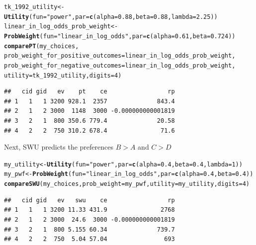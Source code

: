 \documentclass{article}\usepackage[]{graphicx}\usepackage[]{color}
\makeatletter
\newcommand{\hlnum}[1]{\textcolor[rgb]{0.686,0.059,0.569}{#1}}%
\newcommand{\hlstr}[1]{\textcolor[rgb]{0.192,0.494,0.8}{#1}}%
\newcommand{\hlstd}[1]{\textcolor[rgb]{0.345,0.345,0.345}{#1}}%
\newcommand{\hlkwb}[1]{\textcolor[rgb]{0.69,0.353,0.396}{#1}}%
\newcommand{\hlkwc}[1]{\textcolor[rgb]{0.333,0.667,0.333}{#1}}%
\newcommand{\hlkwd}[1]{\textcolor[rgb]{0.737,0.353,0.396}{\textbf{#1}}}%
\newenvironment{kframe}{%
 \def\at@end@of@kframe{}%
 \ifinner\ifhmode%
  \def\at@end@of@kframe{\end{minipage}}%
  \begin{minipage}{\columnwidth}%
 \fi\fi%
 \def\FrameCommand##1{\hskip\@totalleftmargin \hskip-\fboxsep
 \colorbox{shadecolor}{##1}\hskip-\fboxsep
     \hskip-\linewidth \hskip-\@totalleftmargin \hskip\columnwidth}%
 \MakeFramed {\advance\hsize-\width
   \@totalleftmargin\z@ \linewidth\hsize
   \@setminipage}}%
 {\par\unskip\endMakeFramed%
 \at@end@of@kframe}
\newenvironment{knitrout}{}{} %
\makeatother
\begin{document}
\begin{knitrout}
\color{fgcolor}\begin{kframe}
\begin{alltt}
\hlstd{tk_1992_utility} \hlkwb{<-} \hlkwd{Utility}\hlstd{(}\hlkwc{fun}\hlstd{=}\hlstr{"power"}\hlstd{,} \hlkwc{par}\hlstd{=}\hlkwd{c}\hlstd{(}\hlkwc{alpha}\hlstd{=}\hlnum{0.88}\hlstd{,} \hlkwc{beta}\hlstd{=}\hlnum{0.88}\hlstd{,} \hlkwc{lambda}\hlstd{=}\hlnum{2.25}\hlstd{))}
\hlstd{linear_in_log_odds_prob_weight} \hlkwb{<-} \hlkwd{ProbWeight}\hlstd{(}\hlkwc{fun}\hlstd{=}\hlstr{"linear_in_log_odds"}\hlstd{,} \hlkwc{par}\hlstd{=}\hlkwd{c}\hlstd{(}\hlkwc{alpha}\hlstd{=}\hlnum{0.61}\hlstd{,} \hlkwc{beta}\hlstd{=}\hlnum{0.724}\hlstd{))}
\hlkwd{comparePT}\hlstd{(my_choices,}
        \hlkwc{prob_weight_for_positive_outcomes}\hlstd{=linear_in_log_odds_prob_weight,}
        \hlkwc{prob_weight_for_negative_outcomes}\hlstd{=linear_in_log_odds_prob_weight,}
        \hlkwc{utility}\hlstd{=tk_1992_utility,} \hlkwc{digits}\hlstd{=}\hlnum{4}\hlstd{)}
\end{alltt}
\begin{verbatim}
##   cid gid   ev    pt    ce                 rp
## 1   1   1 3200 928.1  2357              843.4
## 2   1   2 3000  1148  3000 -0.000000000001819
## 3   2   1  800 350.6 779.4              20.58
## 4   2   2  750 310.2 678.4               71.6
\end{verbatim}
\end{kframe}
\end{knitrout}


Next, SWU predicts the preferences $B > A$ and $C > D$

\begin{knitrout}
\color{fgcolor}\begin{kframe}
\begin{alltt}
\hlstd{my_utility} \hlkwb{<-} \hlkwd{Utility}\hlstd{(}\hlkwc{fun}\hlstd{=}\hlstr{"power"}\hlstd{,} \hlkwc{par}\hlstd{=}\hlkwd{c}\hlstd{(}\hlkwc{alpha}\hlstd{=}\hlnum{0.4}\hlstd{,} \hlkwc{beta}\hlstd{=}\hlnum{0.4}\hlstd{,} \hlkwc{lambda}\hlstd{=}\hlnum{1}\hlstd{))}
\hlstd{my_pwf} \hlkwb{<-} \hlkwd{ProbWeight}\hlstd{(}\hlkwc{fun}\hlstd{=}\hlstr{"linear_in_log_odds"}\hlstd{,} \hlkwc{par}\hlstd{=}\hlkwd{c}\hlstd{(}\hlkwc{alpha}\hlstd{=}\hlnum{0.4}\hlstd{,} \hlkwc{beta}\hlstd{=}\hlnum{0.4}\hlstd{))}
\hlkwd{compareSWU}\hlstd{(my_choices,} \hlkwc{prob_weight}\hlstd{=my_pwf,} \hlkwc{utility}\hlstd{=my_utility,} \hlkwc{digits}\hlstd{=}\hlnum{4}\hlstd{)}
\end{alltt}
\begin{verbatim}
##   cid gid   ev   swu    ce                 rp
## 1   1   1 3200 11.33 431.9               2768
## 2   1   2 3000  24.6  3000 -0.000000000001819
## 3   2   1  800 5.155 60.34              739.7
## 4   2   2  750  5.04 57.04                693
\end{verbatim}
\end{kframe}
\end{knitrout}
\end{document}
